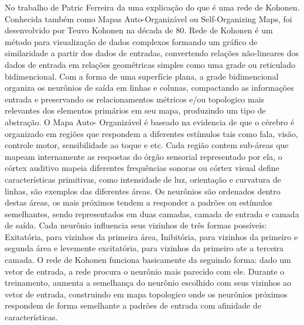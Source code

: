 No trabalho de Patric Ferreira \cite{Patric} da uma explicação do que é uma rede de Kohonen. 
Conhecida também como Mapas Auto-Organizável ou Self-Organizing Maps, foi desenvolvido por Teuvo Kohonen na década de 80. 
Rede de Kohonen é um método para visualização de dados complexos formando um gráfico de similaridade a partir dos dados de entradas, convertendo relações não-lineares dos dados de entrada em relações geométricas simples como uma grade ou reticulado bidimencional. 
Com a forma de uma superfície plana, a grade bidimencional organiza os neurônios de saída em linhas e colunas, compactando as informações entrada e preservando os relacionamentos métricos e/ou topologico mais relevantes dos elementos primários em seu mapa, produzindo um tipo de abstração. 
O Mapa Auto- Organizável é baseado na evidencia de que o cérebro é organizado em regiões que respondem a diferentes estímulos tais como fala, visão, controle motor, sensibilidade ao toque e etc. Cada região contem sub-áreas que mapeam internamente as respostas do órgão sensorial representado por ela, o córtex auditivo mapeia diferentes frequências sonoras ou córtex visual define características primitivas, como intensidade de luz, orientação e curvatura de linhas, são exemplos das diferentes áreas. Os neurônios são ordenados dentro destas áreas, os mais próximos tendem a responder a padrões ou estímulos semelhantes, sendo representados em duas camadas, camada de entrada e camada de saída. Cada neurônio influencia seus vizinhos de três formas possíveis: Exitatória, para vizinhos da primeira área, Inibitória, para vizinhos da  primeiro e segunda área e levemente excitatória, para vizinhos da primeiro ate a terceira camada. 
O rede de Kohonen funciona basicamente da seguindo forma: dado um vetor de entrada, a rede procura o neurônio mais parecido com ele. Durante o treinamento, aumenta a semelhança do neurônio escolhido com seus vizinhos ao vetor de entrada, construindo em mapa topologico onde os neurônios próximos respondem de forma semelhante a padrões de entrada com afinidade de características.

